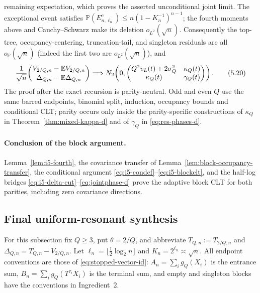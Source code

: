 \documentclass[11pt]{article}
\numberwithin{equation}{section}
\newcommand{\1}{\mathbf 1}\newcommand{\F}{\mathcal F}\newcommand{\D}{\mathcal D}
\begin{document}
remaining expectation, which proves the asserted unconditional joint limit.  The exceptional event satisfies
$\mathbb P(E_{n,\ell_n}^c)\le n(1-K_n^{-1})^{n-1}$; the fourth moments above
and Cauchy--Schwarz make its deletion $o_{L^2}(\sqrt n)$.
Consequently the top-tree, occupancy-centering, truncation-tail, and
singleton residuals are all $o_{\mathbb P}(\sqrt n)$ (indeed the first two
are $o_{L^2}(\sqrt n)$), and
\begin{equation}
 {1\over\sqrt n}\binom{V_{2/Q,n}-\mathbb EV_{2/Q,n}}
 {\Delta_{Q,n}-\mathbb E\Delta_{Q,n}}
 \Longrightarrow N_2\!\left(0,
 \begin{pmatrix}Q^2v_L(t)+2\sigma_Q^2&\kappa_Q(t)\\
 \kappa_Q(t)&\gamma_Q(t)\end{pmatrix}\right).          \tag{5.20}\label{eq:jointphase-d}
\end{equation}
The proof after the exact recursion is parity-neutral.  Odd and even $Q$ use
the same barred endpoints, binomial split, induction, occupancy bounds and
conditional CLT; parity occurs only inside the parity-specific constructions of $\kappa_Q$ in
Theorem~\ref{thm:mixed-kappa-d} and of $\gamma_Q$ in
\eqref{eq:res-phases-d}.

\paragraph{Conclusion of the block argument.}
Lemma~\ref{lem:i5-fourth}, the covariance transfer of
Lemma~\ref{lem:block-occupancy-transfer}, the conditional argument
\eqref{eq:i5-condcf}--\eqref{eq:i5-blockclt}, and the half-log bridges
\eqref{eq:i5-delta-cut}--\eqref{eq:jointphase-d} prove the adaptive block CLT
for both parities, including zero covariance directions.


\subsection{Final uniform-resonant synthesis}
\label{sec:final-uniform-resonant-d}
For this subsection fix $Q\ge3$, put $\theta=2/Q$, and abbreviate
$T_{Q,n}:=T_{2/Q,n}$ and $\Delta_{Q,n}=T_{Q,n}-V_{2/Q,n}$.
Let $\ell_n=\lfloor\frac12\log_2n\rfloor$ and
$K_n=2^{\ell_n}\asymp\sqrt n$.  All endpoint conventions are those of
\eqref{eq:stopped-vector-id}: $A_n=\sum_i g_Q(X_i)$ is the entrance sum,
$B_n=\sum_i g_Q(T^{\tau_i}X_i)$ is the terminal sum, and empty and singleton
blocks have the conventions in Ingredient~2.
\end{document}
